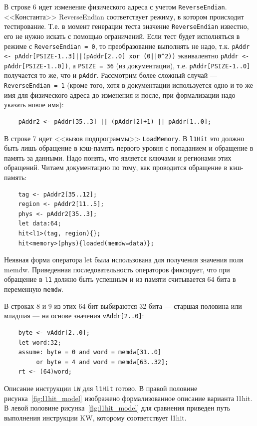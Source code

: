 В строке 6 идет изменение физического адреса с учетом \texttt{ReverseEndian}.
<<Константа>> ReverseEndian соответствует режиму, в котором происходит
тестирование. Т.е. в момент генерации теста значение \texttt{ReverseEndian}
известно, его не нужно искать с помощью ограничений. Если тест будет исполняться
в режиме с \texttt{ReverseEndian = 0}, то преобразование выполнять не надо, т.к.
\texttt{pAddr <- pАddr[PSIZE-1..3]||(pAddr[2..0] xor (0||0\^{ }2))} эквивалентно
\texttt{pAddr <- pАddr[PSIZE-1..0])}, а \texttt{PSIZE = 36} (из документации),
т.е. \texttt{pАddr[PSIZE-1..0]} получается то же, что и \texttt{pАddr}.
Рассмотрим более сложный случай ---\\ \texttt{ReverseEndian = 1} (кроме того, хотя в документации используется одно и то же имя для физического адреса до изменения и после, при формализации надо указать новое имя):
\begin{verbatim}
    pAddr2 <- pAddr[35..3] || (pAddr[2]+1) || pAddr[1..0];
\end{verbatim}

В строке 7 идет <<вызов подпрограммы>> \texttt{LoadMemory}. В \texttt{l1Hit} это должно быть лишь
обращение в кэш-память первого уровня с попаданием и обращение в память за
данными. Надо понять, что является ключами и регионами этих обращений. Читаем
документацию по тому, как проводится обращение в кэш-память:
\begin{verbatim}
    tag <- pAddr2[35..12];
    region <- pAddr2[11..5];
    phys <- pAddr2[35..3];
    let data:64;
    hit<l1>(tag, region){};
    hit<memory>(phys){loaded(memdw=data)};
\end{verbatim}

Неявная форма оператора let была использована для получения значения поля memdw. Приведенная последовательность операторов фиксирует, что при обращение в \texttt{l1} должно быть успешным и
из памяти считывается 64 бита в переменную \texttt{memdw}.

В строках 8 и 9 из этих 64 бит выбираются 32 бита  --- старшая половина или младшая --- на основе значения \texttt{vAddr[2..0]}:
\begin{verbatim}
    byte <- vAddr[2..0];
    let word:32;
    assume: byte = 0 and word = memdw[31..0]
         or byte = 4 and word = memdw[63..32];
    rt <- (64)word;
\end{verbatim}

Описание инструкции \texttt{LW} для \texttt{l1Hit} готово. В правой половине рисунка~\ref{fig:l1hit_model} изображено формализованное описание варианта l1hit. В левой половине  рисунка~\ref{fig:l1hit_model} для сравнения приведен путь выполнения инструкции KW, которому соответствует l1hit.

